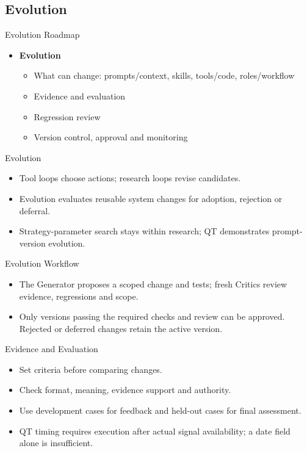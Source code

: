 \subsection{Evolution}
\begin{frame}{Evolution Roadmap}
\begin{itemize}
\item \textbf{Evolution}
\begin{itemize}
\item What can change: prompts/context, skills, tools/code, roles/workflow
\item Evidence and evaluation
\item Regression review
\item Version control, approval and monitoring
\end{itemize}
\end{itemize}
\end{frame}
\begin{frame}{Evolution}
\begin{itemize}
\item Tool loops choose actions; research loops revise candidates.
\item Evolution evaluates reusable system changes for adoption, rejection or deferral.
\item Strategy-parameter search stays within research; QT demonstrates prompt-version evolution.
\end{itemize}
\end{frame}
\begin{frame}{Evolution Workflow}
\setlength{\topsep}{0pt}
\begin{center}
\resizebox{.90\textwidth}{!}{}
\end{center}
\begin{itemize}
\item The Generator proposes a scoped change and tests; fresh Critics review evidence, regressions and scope.
\item Only versions passing the required checks and review can be approved. Rejected or deferred changes retain the active version.
\end{itemize}
\end{frame}
\begin{frame}{Evidence and Evaluation}
\begin{center}\resizebox{.90\textwidth}{!}{}\end{center}
\begin{itemize}
\item Set criteria before comparing changes.
\item Check format, meaning, evidence support and authority.
\item Use development cases for feedback and held-out cases for final assessment.
\item QT timing requires execution after actual signal availability; a date field alone is insufficient.
\end{itemize}
\end{frame}
